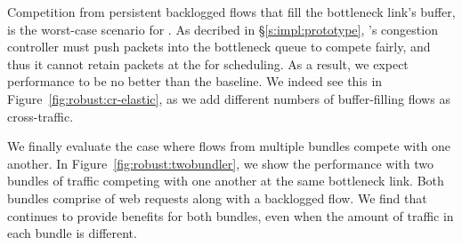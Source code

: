 
 Competition from persistent backlogged flows that fill the bottleneck link's buffer, is the worst-case scenario for \name.
As decribed in \S\ref{s:impl:prototype}, \name's congestion controller must push packets into the bottleneck queue to compete fairly, and thus it cannot retain packets at the \inbox for scheduling. As a result, we expect performance to be no better than the baseline. We indeed see this in Figure~\ref{fig:robust:cr-elastic}, as we add different numbers of buffer-filling flows as cross-traffic.



 We finally evaluate the case where flows from multiple bundles compete with one another. 
In Figure~\ref{fig:robust:twobundler}, we show the performance with two bundles of traffic competing with one another at the same bottleneck link. Both bundles comprise of web requests along with a backlogged flow. We find that \name continues to provide benefits for both bundles, even when the amount of traffic in each bundle is different.  

